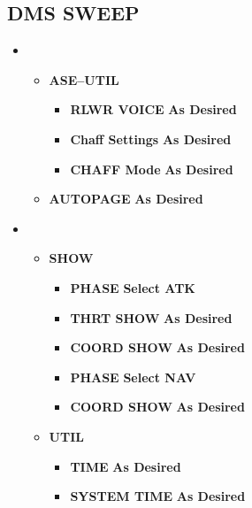 \documentclass[fontHelvetica]{TechCheck}
\begin{document}
	\subsection{DMS SWEEP}
	\begin{itemize}[leftmargin=0.1\linewidth,rightmargin=0.1\linewidth, itemsep=4pt]
		\item {}
		\begin{itemize}[itemsep=4pt]
			\item \textbf{ASE--UTIL}
			\begin{itemize}[itemsep=4pt]
				\item \textbf{RLWR VOICE} \dotfill \textbf{As Desired}
				\item \textbf{Chaff Settings} \dotfill \textbf{As Desired}
				\item \textbf{CHAFF Mode} \dotfill \textbf{As Desired}
			\end{itemize}
			\item \textbf{AUTOPAGE} \dotfill \textbf{As Desired}
		\end{itemize}
		\item {}
		\begin{itemize}[itemsep=4pt]
			\item \textbf{SHOW}
			\begin{itemize}[itemsep=4pt]
				\item \textbf{PHASE} \dotfill \textbf{Select ATK}
				\item \textbf{THRT SHOW} \dotfill \textbf{As Desired}
				\item \textbf{COORD SHOW} \dotfill \textbf{As Desired}
				\item \textbf{PHASE} \dotfill \textbf{Select NAV}
				\item \textbf{COORD SHOW} \dotfill \textbf{As Desired}
			\end{itemize}
			\item \textbf{UTIL}
			\begin{itemize}[itemsep=4pt]
				\item \textbf{TIME} \dotfill \textbf{As Desired}
				\item \textbf{SYSTEM TIME} \dotfill \textbf{As Desired}
			\end{itemize}

\end{itemize}
\end{itemize}
\end{document}
